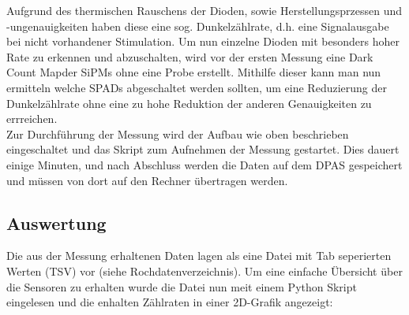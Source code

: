 \documentclass[12pt,twoside,a4paper]{scrartcl}
\begin{document}
			Aufgrund des thermischen Rauschens der Dioden, sowie Herstellungsprzessen und -ungenauigkeiten haben diese eine sog. \glqq Dunkelzählrate\grqq, d.h. eine Signalausgabe bei nicht vorhandener Stimulation. Um nun einzelne Dioden mit besonders hoher Rate zu erkennen und abzuschalten, wird vor der ersten Messung eine \glqq Dark Count Map\grqq der SiPMs ohne eine Probe erstellt. Mithilfe dieser kann man nun ermitteln welche SPADs abgeschaltet werden sollten, um eine Reduzierung der Dunkelzählrate ohne eine zu hohe Reduktion der anderen Genauigkeiten zu errreichen.\\
			Zur Durchführung der Messung wird der Aufbau wie oben beschrieben eingeschaltet und das Skript zum Aufnehmen der Messung gestartet. Dies dauert einige Minuten, und nach Abschluss werden die Daten auf dem DPAS gespeichert und müssen von dort auf den Rechner übertragen werden.

		\subsection{Auswertung}

			Die aus der Messung erhaltenen Daten lagen als eine Datei mit Tab seperierten Werten (TSV) vor (siehe Rochdatenverzeichnis). Um eine einfache Übersicht über die Sensoren zu erhalten wurde die Datei nun meit einem Python Skript eingelesen und die enhalten Zählraten in einer 2D-Grafik angezeigt:
\end{document}

